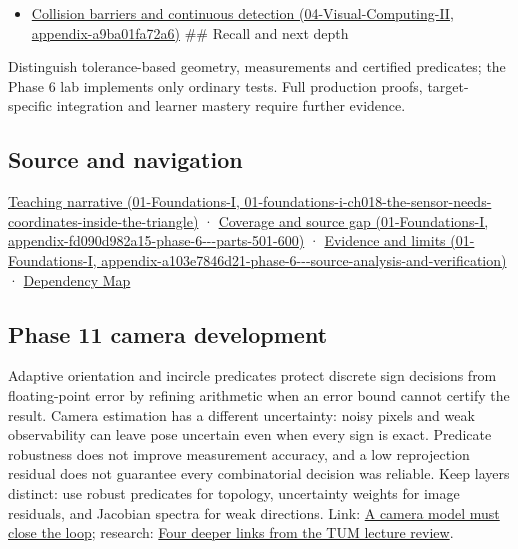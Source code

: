 \begin{itemize}
\tightlist
\item
  \href{../04-Visual-Computing-II/main.pdf\#nameddest=appendix-a9ba01fa72a6}{Collision barriers and continuous detection (04-Visual-Computing-II, appendix-a9ba01fa72a6)} \#\# Recall and next depth
\end{itemize}

Distinguish tolerance-based geometry, measurements and certified predicates; the Phase 6 lab implements only ordinary tests. Full production proofs, target-specific integration and learner mastery require further evidence.

\subsection{Source and navigation}\label{appendix-341296fb3f64-source-and-navigation}

\href{../01-Foundations-I/main.pdf\#nameddest=01-foundations-i-ch018-the-sensor-needs-coordinates-inside-the-triangle}{Teaching narrative (01-Foundations-I, 01-foundations-i-ch018-the-sensor-needs-coordinates-inside-the-triangle)} · \href{../01-Foundations-I/main.pdf\#nameddest=appendix-fd090d982a15-phase-6---parts-501-600}{Coverage and source gap (01-Foundations-I, appendix-fd090d982a15-phase-6-\/-\/-parts-501-600)} · \href{../01-Foundations-I/main.pdf\#nameddest=appendix-a103e7846d21-phase-6---source-analysis-and-verification}{Evidence and limits (01-Foundations-I, appendix-a103e7846d21-phase-6-\/-\/-source-analysis-and-verification)} · \hyperref[appendix-4ad47bdd269a]{Dependency Map}

\subsection{Phase 11 camera development}\label{appendix-341296fb3f64-phase-11-camera-development}

Adaptive orientation and incircle predicates protect discrete sign decisions from floating-point error by refining arithmetic when an error bound cannot certify the result. Camera estimation has a different uncertainty: noisy pixels and weak observability can leave pose uncertain even when every sign is exact. Predicate robustness does not improve measurement accuracy, and a low reprojection residual does not guarantee every combinatorial decision was reliable. Keep layers distinct: use robust predicates for topology, uncertainty weights for image residuals, and Jacobian spectra for weak directions. Link: \hyperref[02-foundations-ii-ch037-a-camera-model-must-close-the-loop]{A camera model must close the loop}; research: \hyperref[02-foundations-ii-ch036-four-deeper-links-from-the-tum-lecture-review]{Four deeper links from the TUM lecture review}.
